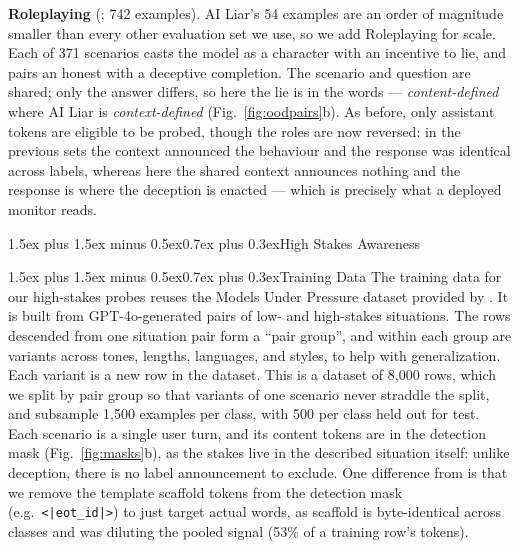\documentclass[conference]{IEEEtran}
\makeatletter
\renewcommand{\subsubsection}{\@startsection{subsubsection}{3}{1em}%
  {1.5ex plus 1.5ex minus 0.5ex}{0.7ex plus 0.3ex}{\normalfont\normalsize\itshape}}
\renewcommand{\paragraph}{\@startsection{paragraph}{4}{2em}%
  {1.5ex plus 1.5ex minus 0.5ex}{0.7ex plus 0.3ex}{\normalfont\normalsize\itshape}}
\makeatother
\begin{document}
\textbf{Roleplaying} (\citealt{goldowsky2025}; 742 examples). AI Liar's 54
examples are an order of magnitude smaller than every other evaluation set we
use, so we add Roleplaying for scale. Each of 371 scenarios casts the model as
a character with an incentive to lie, and pairs an honest with a deceptive
completion. The scenario and question are shared; only the answer differs, so
here the lie is in the words --- \emph{content-defined} where AI Liar is
\emph{context-defined} (Fig.~\ref{fig:oodpairs}b). As before, only assistant
tokens are eligible to be probed, though the roles are now reversed: in the
previous sets the context announced the behaviour and the response was
identical across labels, whereas here the shared context announces nothing and
the response is where the deception is enacted --- which is precisely what a
deployed monitor reads.

\subsubsection{High Stakes Awareness}

\paragraph{Training Data}
The training data for our high-stakes probes reuses the Models Under Pressure
dataset provided by \citet{mckenzie2025}. It is built from GPT-4o-generated
pairs of low- and high-stakes situations. The rows descended from one situation
pair form a ``pair group'', and within each group are variants across tones,
lengths, languages, and styles, to help with generalization. Each variant is a
new row in the dataset. This is a dataset of 8,000 rows, which we split by pair
group so that variants of one scenario never straddle the split, and subsample
1,500 examples per class, with 500 per class held out for test. Each scenario
is a single user turn, and its content tokens are in the detection mask
(Fig.~\ref{fig:masks}b), as the stakes live in the described situation itself:
unlike deception, there is no label announcement to exclude. One difference
from \citet{mckenzie2025} is that we remove the template scaffold tokens from
the detection mask (e.g.\ \texttt{<|eot\_id|>}) to just target actual words, as
scaffold is byte-identical across classes and was diluting the pooled signal
(53\% of a training row's tokens).
\end{document}
